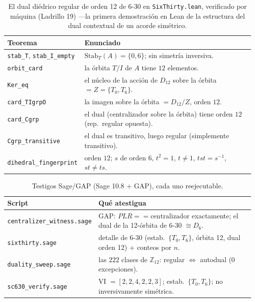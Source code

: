 \documentclass[11pt]{article}
\newcommand{\lean}[1]{\texttt{#1}}
\newcommand{\Ztwelve}{\mathbb{Z}_{12}}
\newcommand{\Dgrp}[1]{D_{#1}}
\newcommand{\Stab}{\mathrm{Stab}}
\begin{document}
\begin{table}[h]
\centering\small
{}
\begin{tabular}{@{}l p{}@{}}
\toprule
\rowcolor{ctA!22}
\textbf{Teorema} & \textbf{Enunciado}\\
\midrule
\lean{stab\_T}, \lean{stab\_I\_empty} & $\Stab_T(A)=\{0,6\}$; sin simetría inversiva.\\
\lean{orbit\_card}                    & la órbita $T/I$ de $A$ tiene $12$ elementos.\\
\lean{Ker\_eq}                        & el núcleo de la acción de $\Dgrp{12}$ sobre la órbita $=Z=\{T_0,T_6\}$.\\
\lean{card\_TIgrpO}                   & la imagen sobre la órbita $=\Dgrp{12}/Z$, orden $12$.\\
\lean{card\_Cgrp}                     & el dual (centralizador sobre la órbita) tiene orden $12$ (rep.\ regular opuesta).\\
\lean{Cgrp\_transitive}              & el dual es transitivo, luego regular (simplemente transitivo).\\
\lean{dihedral\_fingerprint}          & orden $12$; $s$ de orden $6$, $t^2=1$, $t\ne1$, $tst=s^{-1}$, $st\ne ts$.\\
\bottomrule
\end{tabular}
\caption{El dual diédrico regular de orden 12 de 6-30 en \lean{SixThirty.lean}, verificado por máquina
(Ladrillo 19) ---la primera demostración en Lean de la estructura del dual contextual de un acorde
simétrico.}
\label{tab:s30}
\end{table}

\begin{table}[h]
\centering\small
{}
\begin{tabular}{@{}l p{}@{}}
\toprule
\rowcolor{ctA!22}
\textbf{Script} & \textbf{Qué atestigua}\\
\midrule
\lean{centralizer\_witness.sage} & GAP: $PLR==\mathrm{centralizador}$ exactamente; el dual de la 12-órbita de 6-30 $\cong\Dgrp{6}$.\\
\lean{sixthirty.sage}            & detalle de 6-30 (estab.\ $\{T_0,T_6\}$, órbita 12, dual orden 12) + conteos por $n$.\\
\lean{duality\_sweep.sage}       & las $222$ clases de $\Ztwelve$: regular $\iff$ autodual (0 excepciones).\\
\lean{sc630\_verify.sage}        & VI $=[2,2,4,2,2,3]$; estab.\ $\{T_0,T_6\}$; no inversivamente simétrica.\\
\bottomrule
\end{tabular}
\caption{Testigos Sage/GAP (Sage 10.8 + GAP), cada uno reejecutable.}
\label{tab:sage}
\end{table}
\end{document}
